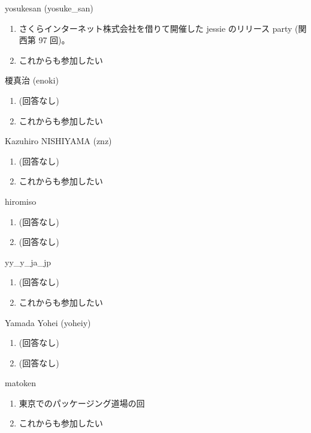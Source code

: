 \begin{prework}{ yosukesan (yosuke\_san) }
  \begin{enumerate}
  \item さくらインターネット株式会社を借りて開催した jessie のリリース party (関西第 97 回)。
  \item これからも参加したい
  \end{enumerate}
\end{prework}

\begin{prework}{ 榎真治 (enoki) }
  \begin{enumerate}
  \item (回答なし)
  \item これからも参加したい
  \end{enumerate}
\end{prework}

\begin{prework}{ Kazuhiro NISHIYAMA (znz) }
  \begin{enumerate}
  \item (回答なし)
  \item これからも参加したい
  \end{enumerate}
\end{prework}

\begin{prework}{ hiromiso }
  \begin{enumerate}
  \item (回答なし)
  \item (回答なし)
  \end{enumerate}
\end{prework}

\begin{prework}{ yy\_y\_ja\_jp }
  \begin{enumerate}
  \item (回答なし)
  \item これからも参加したい
  \end{enumerate}
\end{prework}

\begin{prework}{ Yamada Yohei (yoheiy) }
  \begin{enumerate}
  \item (回答なし)
  \item (回答なし)
  \end{enumerate}
\end{prework}

\begin{prework}{ matoken }
  \begin{enumerate}
  \item 東京でのパッケージング道場の回
  \item これからも参加したい
  \end{enumerate}
\end{prework}
